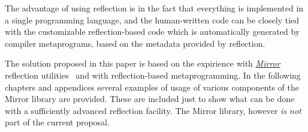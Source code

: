 The advantage of using reflection is in the fact that everything
is implemented in a single programming language, and the human-written
code can be closely tied with the customizable reflection-based
code which is automatically generated by compiler metaprograms,
based on the metadata provided by reflection.

The solution proposed in this paper is based on the expirience with
\href{http://kifri.fri.uniza.sk/~chochlik/mirror-lib/html/}{\em Mirror}
reflection utilities~\cite{mirror-doc-cpp11} and with reflection-based
metaprogramming.
In the following chapters and appendices several examples of usage of various
components of the Mirror library are provided. These are included just to show
what can be done with a sufficiently advanced reflection facility.
The Mirror library, however {\em is not} part of the current proposal.
